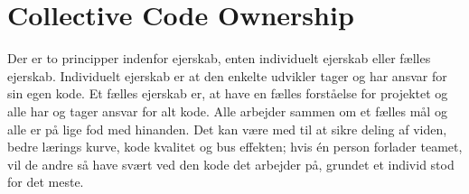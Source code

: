 \section{Collective Code Ownership}\label{sec:collective}
Der er to principper indenfor ejerskab, enten individuelt ejerskab eller fælles ejerskab. 
Individuelt ejerskab er at den enkelte udvikler tager og har ansvar for sin egen kode. 
Et fælles ejerskab er, at have en fælles forståelse for projektet og alle har og tager ansvar for alt kode. 
Alle arbejder sammen om et fælles mål og alle er på lige fod med hinanden. 
Det kan være med til at sikre deling af viden, bedre lærings kurve, kode kvalitet og bus effekten; 
hvis én person forlader teamet, vil de andre så have svært ved den kode det arbejder på, 
grundet et individ stod for det meste.